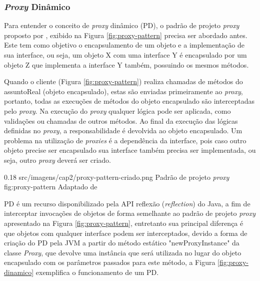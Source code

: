 \subsubsection{\textit{Proxy} Dinâmico}

\par Para entender o conceito de \textit{proxy} dinâmico (PD), o padrão de projeto \textit{proxy} proposto por , exibido na Figura \ref{fig:proxy-pattern} precisa ser abordado antes. Este tem como objetivo o encapsulamento de um objeto e a implementação de sua interface, ou seja, um objeto X com uma interface Y é encapsulado por um objeto Z que implementa a interface Y também, possuindo os mesmos métodos.

\par Quando o cliente (Figura \ref{fig:proxy-pattern}) realiza chamadas de métodos do assuntoReal (objeto encapsulado), estas são enviadas primeiramente ao \textit{proxy}, 
portanto, todas as execuções de métodos do objeto encapsulado são interceptadas pelo \textit{proxy}. Na execução do \textit{proxy} qualquer lógica pode ser aplicada, como validações ou chamadas de outros métodos. Ao final da execução das lógicas definidas no \textit{proxy}, a responsabilidade é devolvida ao objeto encapsulado. Um problema na utilização de \textit{proxies} é a dependência da interface, pois caso outro objeto precise ser encapsulado sua interface também precisa ser implementada, ou seja, outro \textit{proxy} deverá ser criado.

\begin{image}
{0.18} %
{src/imagens/cap2/proxy-pattern-criado.png} %
{Padrão de projeto \textit{proxy}} %
{fig:proxy-pattern} %
{Adaptado de \cite{gamma1995design}} %
\end{image}


\par PD é um recurso disponibilizado pela API reflexão (\textit{reflection}) do Java, a fim de interceptar invocações de objetos de forma semelhante ao padrão de projeto \textit{proxy} apresentado na Figura \ref{fig:proxy-pattern}, entretanto sua principal diferença é que objetos com qualquer interface podem ser interceptados, devido a forma de criação do PD pela JVM a partir do método estático "newProxyInstance" da classe \textit{Proxy}, que devolve uma instância que será utilizada no lugar do objeto encapsulado com os parâmetros passados para este método, a Figura \ref{fig:proxy-dinamico} exemplifica o funcionamento de um PD.

